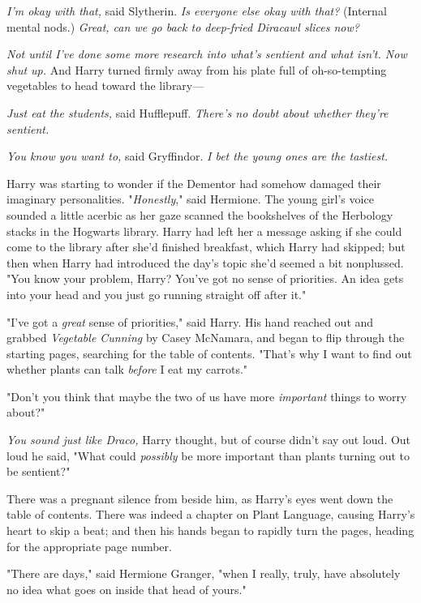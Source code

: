 \emph{I’m okay with that,} said Slytherin. \emph{Is everyone else okay with
that?} (Internal mental nods.) \emph{Great, can we go back to deep-fried
Diracawl slices now?}

\emph{Not until I’ve done some more research into what’s sentient and what
isn’t. Now shut up.} And Harry turned firmly away from his plate full of
oh-so-tempting vegetables to head toward the library—

\emph{Just eat the students,} said Hufflepuff. \emph{There’s no doubt about
whether \emph{they’re} sentient.}

\emph{You know you want to,} said Gryffindor. \emph{I bet the young ones are
the tastiest.}

Harry was starting to wonder if the Dementor had somehow damaged their
imaginary personalities.
\later
"\emph{Honestly}," said Hermione. The young girl’s voice sounded a little
acerbic as her gaze scanned the bookshelves of the Herbology stacks in the
Hogwarts library. Harry had left her a message asking if she could come to the
library after she’d finished breakfast, which Harry had skipped; but then when
Harry had introduced the day’s topic she’d seemed a bit nonplussed. "You know
your problem, Harry? You’ve got no sense of priorities. An idea gets into your
head and you just go running straight off after it."

"I’ve got a \emph{great} sense of priorities," said Harry. His hand reached out
and grabbed \emph{Vegetable Cunning} by Casey McNamara, and began to flip
through the starting pages, searching for the table of contents. "That’s why I
want to find out whether plants can talk \emph{before} I eat my carrots."

"Don’t you think that maybe the two of us have more \emph{important} things to
worry about?"

\emph{You sound just like Draco,} Harry thought, but of course didn’t say out
loud. Out loud he said, "What could \emph{possibly} be more important than
plants turning out to be sentient?"

There was a pregnant silence from beside him, as Harry’s eyes went down the
table of contents. There was indeed a chapter on Plant Language, causing
Harry’s heart to skip a beat; and then his hands began to rapidly turn the
pages, heading for the appropriate page number.

"There are days," said Hermione Granger, "when I really, truly, have absolutely
no idea what goes on inside that head of yours."

